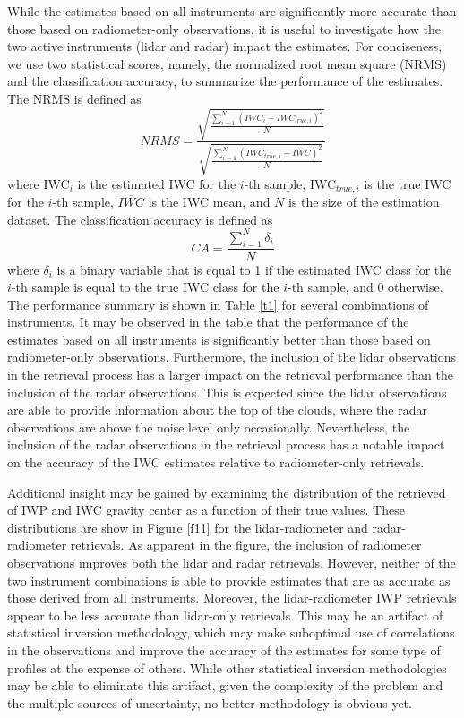 \documentclass{ametsocV6.1}
\begin{document}
While the estimates based on all instruments are significantly more accurate than those based on radiometer-only observations, it is useful to investigate how the two active instruments (lidar and radar) impact the estimates.  For conciseness, we use two statistical scores, namely, the normalized root mean square (NRMS) and the classification accuracy, to summarize the performance of the estimates.  The NRMS is defined as
\begin{equation}
NRMS=\frac {\sqrt {\frac {\sum_{i=1}^{N} (IWC_{i}-IWC_{true,i})^2} {N}}} {\sqrt {\frac {\sum_{i=1}^{N} (IWC_{true,i}-\overline{IWC})^2} {N}}} 
\end{equation}
where IWC$_{i}$ is the estimated IWC for the $i$-th sample, IWC$_{true,i}$ is the true IWC for the $i$-th sample,
$\overline{IWC}$ is the IWC mean, and $N$ is the size of the estimation dataset.  The classification
accuracy is defined as
\begin{equation}
CA=\frac {\sum_{i=1}^{N} \delta_{i}} {N}
\end{equation}
where $\delta_{i}$ is a binary variable that is equal to 1 if the estimated IWC class for the $i$-th sample is equal to the true IWC class for the $i$-th sample, and 0 otherwise. The performance summary is shown in Table \ref{t1} for several combinations of instruments. It may be observed in the table that the performance of the estimates based on all instruments is significantly better than those based on radiometer-only observations.  Furthermore, the inclusion of the lidar observations in the retrieval process has a larger impact on the retrieval performance than the inclusion of the radar
observations.  This is expected since the lidar observations are able to provide information about the top of the clouds, where the radar observations are above the noise level only occasionally. Nevertheless, the inclusion of the radar observations in the retrieval process has a notable impact on the accuracy of the IWC estimates relative to radiometer-only retrievals. 

Additional insight may be gained by examining the distribution of the retrieved of IWP and IWC gravity center as a function of their true values.  These distributions are show in Figure \ref{f11} for the lidar-radiometer and radar-radiometer retrievals.  As apparent in the figure, the inclusion of radiometer observations improves both the lidar and radar retrievals. However, neither of the two instrument combinations is able to provide estimates that are as accurate as those derived from all instruments.  Moreover, the lidar-radiometer IWP retrievals appear to be less accurate than lidar-only retrievals. This may be an artifact of statistical inversion methodology, which may make suboptimal use of correlations in the observations and improve the accuracy of the estimates for some type of profiles at the expense of others.  While other statistical inversion methodologies may be able to eliminate this artifact, given the complexity of the problem and the multiple sources of uncertainty, no better methodology is
obvious yet.
\end{document}
